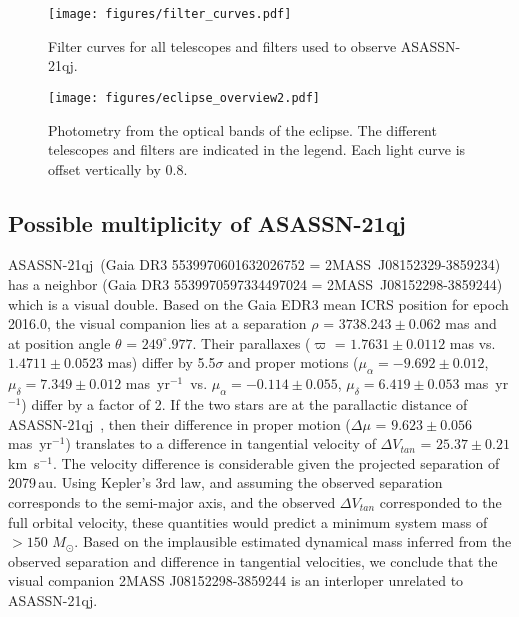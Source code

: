 \documentclass{aa}
\newcommand{\asas}{ASASSN-21qj}
\newcommand{\kms}{km~s$^{-1}$\xspace}
\newcommand{\masyr}{mas~yr$^{-1}$}
\newcommand{\msun}{$M_\odot$}
\begin{document}
\begin{figure}
   \begin{centering}
   \texttt{[image: figures/filter\_curves.pdf]}
      \caption{Filter curves for all telescopes and filters used to observe \asas.}
      \label{fig:allfilters}
      \end{centering}
\end{figure}


\begin{figure*}
   \begin{centering}
   \texttt{[image: figures/eclipse\_overview2.pdf]}
      \caption{Photometry from the optical bands of the eclipse.
The different telescopes and filters are indicated in the legend.
%
Each light curve is offset vertically by 0.8.
              }
        \label{fig:eclipse_overview}
    \end{centering}
\end{figure*}

\subsection{Possible multiplicity of \asas} 
\label{subsec:companion}

\asas\ (Gaia DR3 5539970601632026752 = 2MASS~J08152329-3859234) has a neighbor (Gaia DR3 5539970597334497024 = 2MASS~J08152298-3859244) which is a visual double.
%
Based on the Gaia EDR3 mean ICRS position for epoch 2016.0, the visual companion lies at a separation $\rho$ = $3738.243\pm0.062$ mas and at position angle $\theta$ = $249^{\circ}.977$.
%
Their parallaxes ($\varpi$ = $1.7631\pm0.0112$ mas vs. $1.4711\pm0.0523$ mas) differ by 5.5$\sigma$ and proper motions ($\mu_{\alpha} = -9.692\pm0.012$, $\mu_{\delta} = 7.349\pm0.012$ \masyr\, vs. $\mu_{\alpha} = -0.114\pm0.055$, $\mu_{\delta} = 6.419\pm0.053$ \masyr) differ by a factor of 2.
%
If the two stars are at the parallactic distance of \asas\ \citep[$d$ = 552.4 pc;][]{BailerJones21}, then their difference in proper motion ($\Delta\mu$ = $9.623\pm0.056$ \masyr) translates to a difference in tangential velocity of $\Delta V_{tan}$ = $25.37\pm0.21$ \kms.
%
The velocity difference is considerable given the projected separation of 2079\,au.
%
Using Kepler's 3rd law, and assuming the observed separation corresponds to the semi-major axis, and the observed $\Delta V_{tan}$ corresponded to the full orbital velocity, these quantities would predict a minimum system mass of $>150$ \msun.
%
Based on the implausible estimated dynamical mass inferred from the observed separation and difference in tangential velocities, we conclude that the visual companion 2MASS J08152298-3859244 is an interloper unrelated to \asas.
\end{document}
